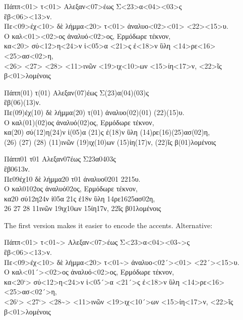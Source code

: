 \begin{typeGreek}
Πάππ<01> τ<01> Αλεξαν<07>έως Σ<23>α<04><03>ς \\ 
ἓβ<06><13>ν. \\ 
Πε<09>έχ<10> δὲ λήμμα<20> τ<01> ἀναλυο<02><01> <22><15>υ. \\ 
Ο καλ<01><02>ος ἀναλυό<02>ος, Ερμόδωρε τέκνον, \\ 
κα<20> σύ<12>η<24>ν ἰ<05>α <21>ς ἐ<18>ν ὓλη <14>ρε<16><25>ασ<02>η, \\ 
<26> <27> <28>  <11>ινῶν <19>ιχ<10>ων <15>ίη<17>ν, <22>ῖς β<01>λομένοις \\ 
\end{typeGreek}

\begin{typeGreek}
Πάππ(01) τ(01) Αλεξαν(07)έως Σ(23)α(04)(03)ς \\ 
ἓβ(06)(13)ν. \\ 
Πε(09)έχ(10) δὲ λήμμα(20) τ(01) ἀναλυο(02)(01) (22)(15)υ. \\ 
Ο καλ(01)(02)ος ἀναλυό(02)ος, Ερμόδωρε τέκνον, \\ 
κα(20) σύ(12)η(24)ν ἰ(05)α (21)ς ἐ(18)ν ὓλη (14)ρε(16)(25)ασ(02)η, \\ 
(26) (27) (28)  (11)ινῶν (19)ιχ(10)ων (15)ίη(17)ν, (22)ῖς β(01)λομένοις \\ 
\end{typeGreek}

\begin{typeGreek}
Πάππ01 τ01 Αλεξαν07έως Σ23α0403ς \\ 
ἓβ0613ν. \\ 
Πε09έχ10 δὲ λήμμα20 τ01 ἀναλυο0201 2215υ. \\ 
Ο καλ0102ος ἀναλυό02ος, Ερμόδωρε τέκνον, \\ 
κα20 σύ12η24ν ἰ05α 21ς ἐ18ν ὓλη 14ρε1625ασ02η, \\ 
26 27 28  11ινῶν 19ιχ10ων 15ίη17ν, 22ῖς β01λομένοις \\ 
\end{typeGreek}

The first version makes it easier to encode the accents. Alternative: 

\begin{typeGreek}
Πάππ<01> τ<01\textasciitilde> Αλεξαν<07>έως Σ<23>α<04><03\textasciitilde>ς \\ 
ἓβ<06><13>ν. \\ 
Πε<09>έχ<10> δὲ λήμμα<20> τ<01\textasciitilde> ἀναλυο<02´><01> <22´><15>υ. \\ 
Ο καλ<01´><02>ος ἀναλυό<02>ος, Ερμόδωρε τέκνον, \\ 
κα<20`> σύ<12>η<24>ν ἰ<05´>α <21´>ς ἐ<18>ν ὓλη <14>ρε<16><25>ασ<02´>η, \\ 
<26`> <27`> <28\textasciitilde>  <11>ινῶν <19>ιχ<10´>ων <15>ίη<17>ν, <22>ῖς β<01>λομένοις \\ 
\end{typeGreek}

